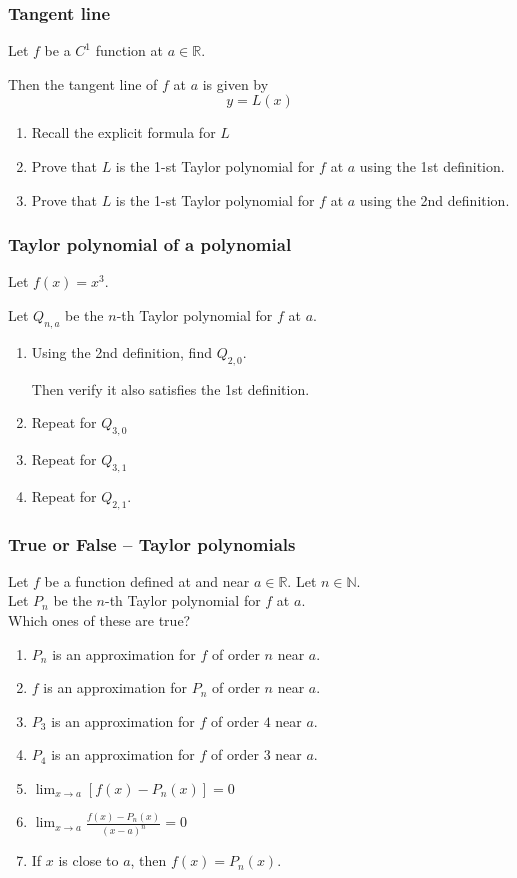 \documentclass[14pt]{beamer}
\newcommand {\DS} [1] {${\displaystyle #1}$}
\newcommand {\R}{\mathbb{R}}
\newcommand {\N}{\mathbb{N}}
\newcommand{\p}{\pause}
\newcommand{\setsize}[1]{\fontsize{#1}{#1}\selectfont} %
\newcommand{\smallerfont}{\setsize{13}} %
\newcommand{\vvv}{\vspace{.2cm}}
\begin{document}
\begin{frame}[t]
\frametitle{Tangent line}

Let $f$ be a $C^1$ function at $a \in \R$.

Then the tangent line of $f$ at $a$ is given by 
	$$
		y = L(x)
	$$
\begin{enumerate}
	\item  Recall the explicit formula for $L$
	\item  Prove that $L$ is the 1-st Taylor polynomial for $f$ at $a$ using the 1st definition.
	\item  Prove that $L$ is the 1-st Taylor polynomial for $f$ at $a$ using the 2nd definition.
\end{enumerate}	

\end{frame}
\begin{frame}[t]
\frametitle{Taylor polynomial of a polynomial}

Let $f(x) = x^3$.

Let $Q_{n,a}$ be the $n$-th Taylor polynomial for $f$ at $a$.
\vvv

	\begin{enumerate}
		\item  Using the 2nd definition, find $Q_{2,0}$.
		
			Then verify it also satisfies the 1st definition.			
		\vvv
\p		\item  Repeat for $Q_{3,0}$
		\vvv
		\item  Repeat for $Q_{3,1}$
		\vvv
		\item  Repeat for $Q_{2,1}$.
	\end{enumerate}

\end{frame}
\begin{frame}[t]
\smallerfont
\frametitle{True or False -- Taylor polynomials}

Let $f$ be a function defined at and near $a \in \R$.   Let \DS{n \in \N}. \\
Let $P_n$ be the $n$-th Taylor polynomial for $f$ at $a$. \\
Which ones of these are true?

\begin{enumerate}
	\item $P_n$ is an approximation for $f$ of order $n$ near $a$.
\vfill
	\item $f$ is an approximation for $P_n$ of order $n$ near $a$.
\vfill
	\item $P_3$ is an approximation for $f$ of order $4$ near $a$.
\vfill
	\item $P_4$ is an approximation for $f$ of order $3$ near $a$.
\vfill
	\item  \DS{\lim_{x \to a} \left[ f(x) - P_n(x) \right] = 0}
\vfill
	\item  \DS{\lim_{x \to a} \frac{f(x) - P_n(x)}{(x-a)^n} = 0  }
\vfill
	\item If $x$ is close to $a$, then $f(x) = P_n(x)$.
\vfill
\end{enumerate}

\end{frame}
\end{document}
